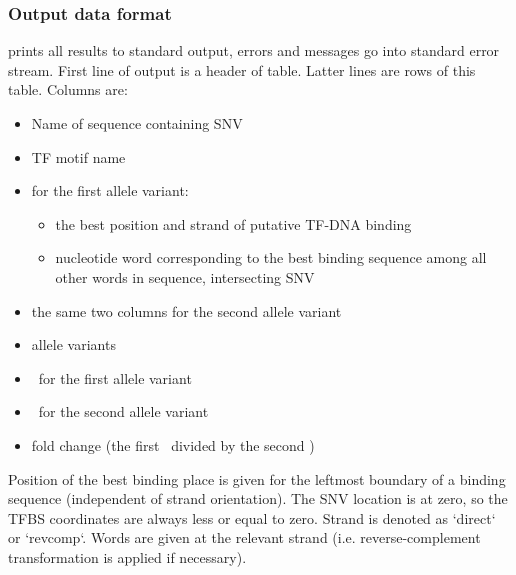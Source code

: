 \subsubsection{Output data format}

 prints all results to standard output, errors and messages go into standard error stream. First line of output is a header of table. Latter lines are rows of this table. Columns are:
\begin{itemize}
\item Name of sequence containing SNV
\item TF motif name
\item for the first allele variant:
\begin{itemize}
\item   the best position and strand of putative TF-DNA binding
\item   nucleotide word corresponding to the best binding sequence among all other words in sequence, intersecting SNV
\end{itemize}
\item the same two columns for the second allele variant
\item allele variants
\item \pvalue\ for the first allele variant
\item \pvalue\ for the second allele variant
\item fold change (the first \pvalue\ divided by the second \pvalue)
\end{itemize}

Position of the best binding place is given for the leftmost boundary of a binding sequence (independent of strand orientation). The SNV location is at zero, so the TFBS coordinates are always less or equal to zero. Strand is denoted as `direct` or `revcomp`. Words are given at the relevant strand (i.e. reverse-complement transformation is applied if necessary).
